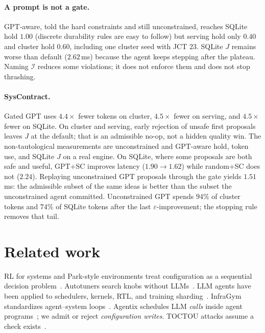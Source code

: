 \documentclass{article}
\begin{document}
\paragraph{A prompt is not a gate.}
GPT-aware, told the hard constraints and still unconstrained, reaches SQLite hold $1.00$ (discrete durability rules are easy to follow) but serving hold only $0.40$ and cluster hold $0.60$, including one cluster seed with JCT $23$.
SQLite $J$ remains worse than default ($2.62$\,ms) because the agent keeps stepping after the plateau.
Naming $\mathcal{I}$ reduces some violations; it does not enforce them and does not stop thrashing.

\paragraph{SysContract.}
Gated GPT uses $4.4\times$ fewer tokens on cluster, $4.5\times$ fewer on serving, and $4.5\times$ fewer on SQLite.
On cluster and serving, early rejection of unsafe first proposals leaves $J$ at the default; that is an admissible no-op, not a hidden quality win.
The non-tautological measurements are unconstrained and GPT-aware hold, token use, and SQLite $J$ on a real engine.
On SQLite, where some proposals are both safe and useful, GPT+SC improves latency ($1.90\to 1.62$) while random+SC does not ($2.24$).
Replaying unconstrained GPT proposals through the gate yields $1.51$\,ms: the admissible subset of the same ideas is better than the subset the unconstrained agent committed.
Unconstrained GPT spends $94\%$ of cluster tokens and $74\%$ of SQLite tokens after the last $\varepsilon$-improvement; the stopping rule removes that tail.

\section{Related work}

RL for systems and Park-style environments treat configuration as a sequential decision problem~\cite{mao2019park,mao2019decima,qiu2020firm}.
Autotuners search knobs without LLMs~\cite{ansel2014opentuner,snoek2012practical}.
LLM agents have been applied to schedulers, kernels, RTL, and training sharding~\cite{zheng2025schedcp,tschand2025swizzleperf,hong2025autocomp,bhattaram2025rtl,ding2025asap}.
InfraGym standardizes agent--system loops~\cite{zhang2025infragym}.
Agentix schedules LLM \emph{calls} inside agent programs~\cite{luo2026agentix}; we admit or reject \emph{configuration writes}.
TOCTOU attacks assume a check exists~\cite{lilienthal2025toctou}.
\end{document}
